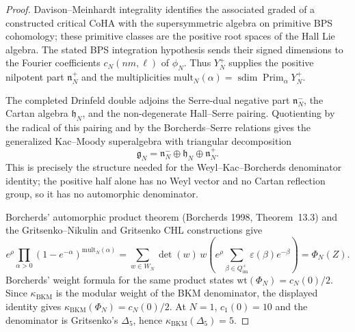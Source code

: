 \begin{proof}
Davison--Meinhardt integrality identifies the associated graded of a
constructed critical CoHA with the supersymmetric algebra on primitive
BPS cohomology; these primitive classes are the positive root spaces of
the Hall Lie algebra. The stated BPS integration hypothesis sends their
signed dimensions to the Fourier coefficients $c_N(nm,\ell)$ of
$\phi_N$. Thus $Y^+_N$ supplies the positive nilpotent part
$\mathfrak n^+_N$ and the multiplicities
$\mathrm{mult}_N(\alpha)=\operatorname{sdim}
\operatorname{Prim}_\alpha Y^+_N$.

The completed Drinfeld double adjoins the Serre-dual negative part
$\mathfrak n^-_N$, the Cartan algebra $\mathfrak h_N$, and the
non-degenerate Hall--Serre pairing. Quotienting by the radical of this
pairing and by the Borcherds--Serre relations gives the generalized
Kac--Moody superalgebra with triangular decomposition
\[
 \mathfrak g_N
 =
 \mathfrak n^-_N\oplus\mathfrak h_N\oplus\mathfrak n^+_N .
\]
This is precisely the structure needed for the Weyl--Kac--Borcherds
denominator identity; the positive half alone has no Weyl vector and no
Cartan reflection group, so it has no automorphic denominator.

Borcherds' automorphic product theorem (Borcherds 1998, Theorem~13.3)
and the Gritsenko--Nikulin and Gritsenko CHL constructions give
\[
 e^\rho
 \prod_{\alpha>0}
 (1-e^{-\alpha})^{\mathrm{mult}_N(\alpha)}
 =
 \sum_{w\in W_N}\det(w)\,
 w\!\left(
 e^\rho
 \sum_{\beta\in Q^+_{\mathrm{im}}}
 \varepsilon(\beta)e^{-\beta}
 \right)
 =
 \Phi_N(Z).
\]
Borcherds' weight formula for the same product states
$\mathrm{wt}(\Phi_N)=c_N(0)/2$. Since
$\kappa_{\mathrm{BKM}}$ is the modular weight of the BKM denominator,
the displayed identity gives
$\kappa_{\mathrm{BKM}}(\Phi_N)=c_N(0)/2$. At $N=1$,
$c_1(0)=10$ and the denominator is Gritsenko's $\Delta_5$, hence
$\kappa_{\mathrm{BKM}}(\Delta_5)=5$.
\end{proof}

